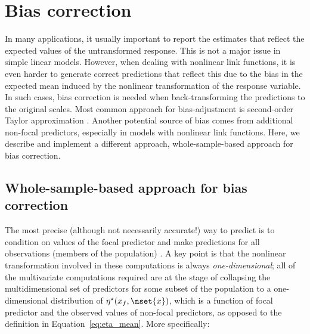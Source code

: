 
\section*{Bias correction}

In many applications, it usually important to report the estimates that reflect the expected values of the untransformed response. This is not a major issue in simple linear models. However, when dealing with nonlinear link functions, it is even harder to generate correct predictions that reflect this due to the bias in the expected mean induced by the nonlinear transformation of the response variable. In such cases, bias correction is needed when back-transforming the predictions to the original scales. Most common approach for bias-adjustment is second-order Taylor approximation \citep{lenth2018package, duursma2003bias}. Another potential source of bias comes from additional non-focal predictors, especially in models with nonlinear link functions. Here, we describe and implement a different approach, whole-sample-based approach for bias correction.


\subsection*{Whole-sample-based approach for bias correction}

The most precise (although not necessarily accurate!) way to predict is to condition on values of the focal predictor and make predictions for all observations (members of the population) \citep{hanmer2013behind}. A key point is that the nonlinear transformation involved in these computations is always \emph{one-dimensional}; all of the multivariate computations required are at the stage of collapsing the multidimensional set of predictors for some subset of the population to a one-dimensional distribution of $\eta^\star(x_f, \nset{x})$, which is a function of focal predictor and the observed values of non-focal predictors, as opposed to the definition in Equation~\ref{eq:eta_mean}. More specifically:

